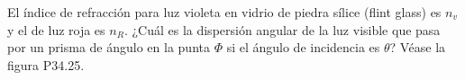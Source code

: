 \item El índice de refracción para luz violeta en vidrio de piedra sílice (flint glass) es $n_v$ y el de luz roja es $n_R$. ¿Cuál es la dispersión angular de la luz visible que pasa por un prisma de ángulo en la punta $\Phi$ si el ángulo de incidencia es $\theta$? Véase la figura P34.25.
